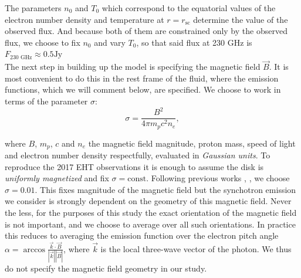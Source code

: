 \documentclass[12pt]{article}
\numberwithin{equation}{section}
\numberwithin{figure}{section}
\begin{document}
	The parameters $n_0$ and $T_0$ which correspond to the equatorial values of the electron number density and temperature at $r = r_\text{sc}$ determine the value of the observed flux. And because both of them are constrained only by the observed flux, we choose to fix $n_0$ and vary $T_0$, so that said flux at 230 GHz is $F_{\text{230 GHz}} \approx 0.5 \text{Jy}$\\
	
	The next step in building up the model is specifying the magnetic field $\vec{B}$. It is most convenient to do this in the rest frame of the fluid, where the emission functions, which we will comment below, are specified. We choose to work in terms of the parameter $\sigma$:
	\begin{equation}
		\sigma = \frac{B^2}{4\pi m_pc^2n_e},
	\end{equation}
	
	where $B$, $m_p$, $c$ and $n_e$ the magnetic field magnitude, proton mass, speed of light and electron number density respectfully, evaluated in \emph{Gaussian units}. To reproduce the 2017 EHT  observations it is enough to assume the disk is \emph{uniformly magnetized} and fix $\sigma = \text{const}$. Following previous works \cite{KERR_SIM_PAPER}, \cite{Geometric_Modeling}, we choose $\sigma = 0.01$. This fixes magnitude of the magnetic field but the synchotron emission we consider is strongly dependent on the geometry of this magnetic field. Never the less, for the purposes of this study the exact orientation of the magnetic field is not important, and we choose to average over all such orientations. In practice this reduces to averaging the emission function over the electron pitch angle  $\alpha = \arccos\frac{\vec{k}\cdot\vec{B}}{|\vec{k}||\vec{B}|}$, where $\vec{k}$ is the local three-wave vector of the photon. We thus do not specify the magnetic field geometry in our study.\\
	
\end{document}
